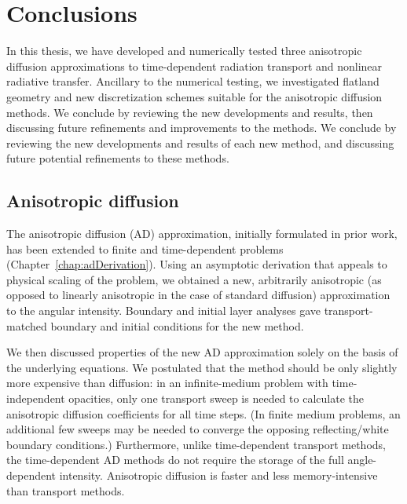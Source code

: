 
\chapter{Conclusions}\label{chap:conclusion}

In this thesis, we have developed and numerically tested three anisotropic
diffusion approximations to time-dependent radiation transport and
nonlinear radiative transfer. Ancillary to the numerical testing, we
investigated flatland geometry and new discretization schemes suitable for the
anisotropic diffusion methods. We conclude by reviewing the new developments and
results, then discussing future refinements and improvements to the methods.
We conclude by reviewing the new developments and results of each new method,
and discussing future potential refinements to these methods.

\section{Anisotropic diffusion}

The anisotropic diffusion (AD) approximation, initially formulated in prior work, has been extended to finite and time-dependent problems
(Chapter~\ref{chap:adDerivation}). Using an asymptotic
derivation that appeals to physical scaling of the problem, we
obtained a new, arbitrarily anisotropic (as opposed to linearly anisotropic in
the case of standard diffusion) approximation to the angular intensity.
Boundary and initial layer analyses gave transport-matched boundary and initial
conditions for the new method.

We then discussed properties of the new AD approximation solely on the basis of
the underlying equations. We postulated that the method should be only slightly
more expensive than diffusion: in an infinite-medium problem with
time-independent opacities, only one transport sweep is needed to calculate
the anisotropic diffusion coefficients for all time steps. (In finite medium
problems, an additional few sweeps may be needed to converge the opposing
reflecting/white boundary conditions.) Furthermore, unlike time-dependent
transport methods, the time-dependent AD methods do not require the storage of
the full angle-dependent intensity. Anisotropic diffusion is faster and less
memory-intensive than transport methods.

